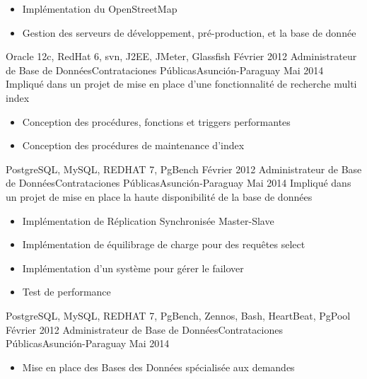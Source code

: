\begin{experiences}
{\begin{itemize}
                        \item Implémentation du OpenStreetMap
                        \item Gestion des serveurs de développement, pré-production, et la base de donnée
                      \end{itemize}
				         }
                 {Oracle 12c, RedHat 6, svn, J2EE, JMeter, Glassfish}
  \emptySeparator
  \projectexperiences
    {Février 2012}   {Administrateur de Base de Données}{Contrataciones Públicas}{Asunción-Paraguay}
    {Mai 2014}      {
                      Impliqué dans un projet de mise en place d'une fonctionnalité de recherche multi index
                    }
                    {
                      \begin{itemize}
                        \item Conception des procédures, fonctions et triggers performantes
                        \item Conception des procédures de maintenance d'index
                      \end{itemize}
                    }
                {PostgreSQL, MySQL, REDHAT 7, PgBench}
  \emptySeparator
  \projectexperiences
    {Février 2012}   {Administrateur de Base de Données}{Contrataciones Públicas}{Asunción-Paraguay}
    {Mai 2014}      {
                      Impliqué dans un projet de mise en place la haute disponibilité de la base de données
                    }
                    {
                      \begin{itemize}
                        \item Implémentation de Réplication Synchronisée Master-Slave
                        \item Implémentation de équilibrage de charge pour des requêtes select
                        \item Implémentation d'un système pour gérer le failover
                        \item  Test de performance
                      \end{itemize}
                    }
                {PostgreSQL, MySQL, REDHAT 7, PgBench, Zennos, Bash, HeartBeat, PgPool}
  \emptySeparator
  \experience
    {Février 2012}   {Administrateur de Base de Données}{Contrataciones Públicas}{Asunción-Paraguay}
    {Mai 2014} {
                      \begin{itemize}
                        \item Mise en place des Bases des Données spécialisée aux demandes

\end{itemize}}
\end{experiences}
